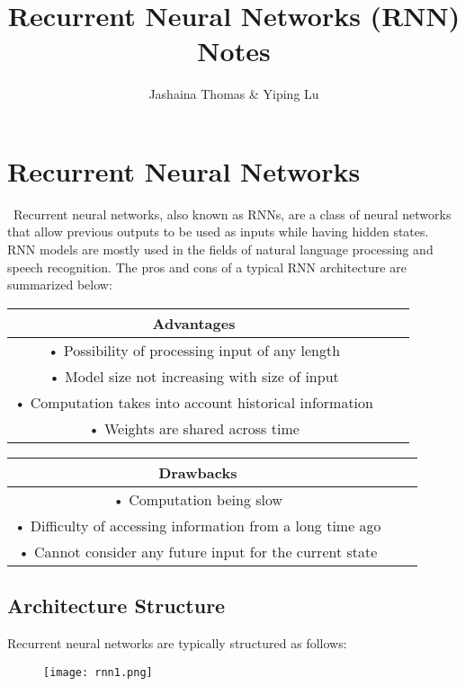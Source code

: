 \documentclass[10pt, oneside]{article}   	%
\title{Recurrent Neural Networks (RNN) Notes}
\author{Jashaina Thomas \& Yiping Lu}
\begin{document}
\maketitle

\section*{Recurrent Neural Networks}\
Recurrent neural networks, also known as RNNs, are a class of neural networks that allow previous outputs to be used as inputs while having hidden states. RNN models are mostly used in the fields of natural language processing and speech recognition. The pros and cons of a typical RNN architecture are summarized below:

\begin{center}
\begin{tabular}{ |c|c|c| } 
 \hline
 Advantages \\ 
 \hline
• Possibility of processing input of any length\\
• Model size not increasing with size of input\\
• Computation takes into account historical information\\
• Weights are shared across time\\
 \hline
\end{tabular}
\end{center}

\begin{center}
\begin{tabular}{ |c|c|c| } 
 \hline
 Drawbacks \\ 
 \hline
• Computation being slow\\
• Difficulty of accessing information from a long time ago\\
• Cannot consider any future input for the current state\\
 \hline
\end{tabular}
\end{center}


\subsection{Architecture Structure}

 Recurrent neural networks are typically structured as follows:
 
 \begin{figure}[h] %
    \centering
    \texttt{[image: rnn1.png]} 
 \end{figure}
 
\end{document}
